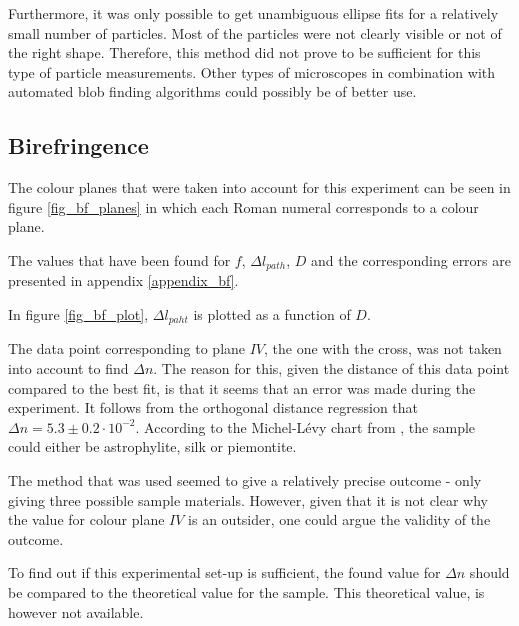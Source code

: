 Furthermore, it was only possible to get unambiguous ellipse fits for a relatively small number of particles. Most of the particles were not clearly visible or not of the right shape. Therefore, this method did not prove to be sufficient for this type of particle measurements. Other types of microscopes in combination with automated blob finding algorithms could possibly be of better use.

\subsection{Birefringence}

The colour planes that were taken into account for this experiment can be seen in figure \ref{fig_bf_planes} in which each Roman numeral corresponds to a colour plane.

The values that have been found for $f$, $\Delta l_{path}$, $D$ and the corresponding errors are presented in appendix \ref{appendix_bf}.

In figure \ref{fig_bf_plot}, $\Delta l_{paht}$ is plotted as a function of $D$.

The data point corresponding to plane $IV$, the one with the cross, was not taken into account to find $\Delta n$. The reason for this, given the distance of this data point compared to the best fit, is that it seems that an error was made during the experiment.
It follows from the orthogonal distance regression that $\Delta n = 5.3 \pm 0.2 \cdot 10^{-2}$. According to the Michel-L\'evy chart from \cite{bf_chart}, the sample could either be astrophylite, silk or piemontite.

The method that was used seemed to give a relatively precise outcome - only giving three possible sample materials. However, given that it is not clear why the value for colour plane $IV$ is an outsider, one could argue the validity of the outcome.

To find out if this experimental set-up is sufficient, the found value for $\Delta n$ should be compared to the theoretical value for the sample. This theoretical value, is however not available.


